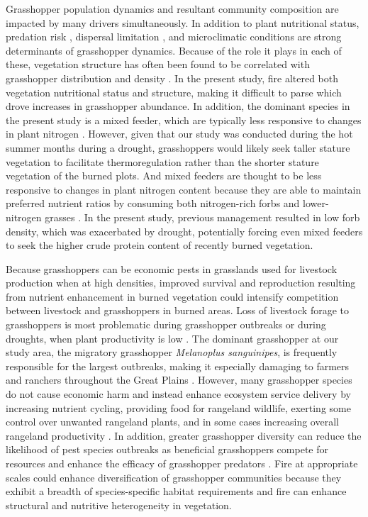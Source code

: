 \documentclass[referee, 
	            sn-basic]
           {sn-jnl}
\begin{document}
\begin{linenumbers}
Grasshopper population dynamics and resultant community composition are impacted by many drivers simultaneously. In addition to plant nutritional status, predation risk \citep{schmitz1997}, dispersal limitation \citep{hawlena2010}, and microclimatic conditions \citep{bauer2007, gardiner2008} are strong determinants of grasshopper dynamics. Because of the role it plays in each of these, vegetation structure has often been found to be correlated with grasshopper distribution and density \citep{joern2004}. In the present study, fire altered both vegetation nutritional status and structure, making it difficult to parse which drove increases in grasshopper abundance. In addition, the dominant species in the present study is a mixed feeder, which are typically less responsive to changes in plant nitrogen \citep{joern2012, jonas2008}. However, given that our study was conducted during the hot summer months during a drought, grasshoppers would likely seek taller stature vegetation to facilitate thermoregulation rather than the shorter stature vegetation of the burned plots. And mixed feeders are thought to be less responsive to changes in plant nitrogen content because they are able to maintain preferred nutrient ratios by consuming both nitrogen-rich forbs and lower-nitrogen grasses \citep{jonas2008}. In the present study, previous management resulted in low forb density, which was exacerbated by drought, potentially forcing even mixed feeders to seek the higher crude protein content of recently burned vegetation. 

Because grasshoppers can be economic pests in grasslands used for livestock production when at high densities, improved survival and reproduction resulting from nutrient enhancement in burned vegetation could intensify competition between livestock and grasshoppers in burned areas. Loss of livestock forage to grasshoppers is most problematic during grasshopper outbreaks or during droughts, when plant productivity is low \citep{belovsky1995, joern2000, branson2014}. The dominant grasshopper at our study area, the migratory grasshopper \emph{Melanoplus sanguinipes}, is frequently responsible for the largest outbreaks, making it especially damaging to farmers and ranchers throughout the Great Plains \citep{onsager2000a, olfert2021}. However, many grasshopper species do not cause economic harm and instead enhance ecosystem service delivery by increasing nutrient cycling, providing food for rangeland wildlife, exerting some control over unwanted rangeland plants, and in some cases increasing overall rangeland productivity \citep{branson2006}. In addition, greater grasshopper diversity can reduce the likelihood of pest species outbreaks as beneficial grasshoppers compete for resources and enhance the efficacy of grasshopper predators \citep{branson2006}. Fire at appropriate scales could enhance diversification of grasshopper communities because they exhibit a breadth of species-specific habitat requirements and fire can enhance structural and nutritive heterogeneity in vegetation. 


\end{linenumbers}
\end{document}
